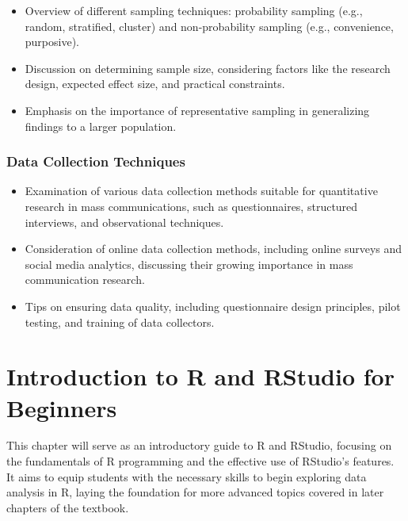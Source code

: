 \documentclass[
]{book}
\begin{document}
\begin{itemize}
\item
  Overview of different sampling techniques: probability sampling (e.g., random, stratified, cluster) and non-probability sampling (e.g., convenience, purposive).
\item
  Discussion on determining sample size, considering factors like the research design, expected effect size, and practical constraints.
\item
  Emphasis on the importance of representative sampling in generalizing findings to a larger population.
\end{itemize}

\hypertarget{data-collection-techniques}{%
\subsection*{Data Collection Techniques}\label{data-collection-techniques}}

\begin{itemize}
\item
  Examination of various data collection methods suitable for quantitative research in mass communications, such as questionnaires, structured interviews, and observational techniques.
\item
  Consideration of online data collection methods, including online surveys and social media analytics, discussing their growing importance in mass communication research.
\item
  Tips on ensuring data quality, including questionnaire design principles, pilot testing, and training of data collectors.
\end{itemize}

\hypertarget{introduction-to-r-and-rstudio-for-beginners}{%
\chapter*{Introduction to R and RStudio for Beginners}\label{introduction-to-r-and-rstudio-for-beginners}}

This chapter will serve as an introductory guide to R and RStudio, focusing on the fundamentals of R programming and the effective use of RStudio's features. It aims to equip students with the necessary skills to begin exploring data analysis in R, laying the foundation for more advanced topics covered in later chapters of the textbook.
\end{document}

